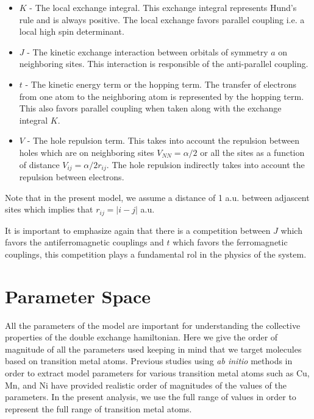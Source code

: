 \documentclass[12pt,twoside]{report}
\begin{document}
	\begin{itemize}
		
		\item $K$ - The local exchange integral. This exchange integral
		  represents Hund's rule and is always positive. The local exchange
		  favors parallel coupling i.e. a local high spin determinant.
		
		\item $J$ - The kinetic exchange interaction between orbitals of
		  symmetry $a$ on neighboring sites. This interaction is responsible of
		  the anti-parallel coupling.
		
		\item $t$ - The kinetic energy term or the hopping term. The transfer of
		  electrons from one atom to the neighboring atom is represented by the
		  hopping term. This also favors parallel coupling when taken along with
		  the exchange integral $K$.
		
		\item $V$ - The hole repulsion term. This takes into account the
		  repulsion between holes which are on neighboring sites $V_{NN}=\alpha
		  \slash 2$ or all the sites as a function of distance $V_{ij}=\alpha
		  \slash 2r_{ij}$. The hole repulsion indirectly takes into account the
		  repulsion between electrons.\cite{calzado_proposal_2001}
		
	\end{itemize}

	Note that in the present model, we assume a distance of 1 a.u. between adjascent
	sites which implies that $r_{ij} = |i-j|$ a.u.
	
	It is important to emphasize again that there is a competition between $J$ which favors the antiferromagnetic couplings and $t$ which favors the ferromagnetic couplings, this competition plays a fundamental rol in the physics of the system.
	
	\section{Parameter Space}
	
	All the parameters of the model are important for understanding the
	collective properties of the double exchange hamiltonian. Here we give the
	order of magnitude of all the parameters used keeping in mind that we target
	molecules based on transition metal atoms.  Previous studies using
	\textit{ab initio} methods in order to extract model parameters for various
	transition metal atoms such as Cu, Mn, and Ni have provided realistic order
	of magnitudes of the values of the parameters.  In the present analysis, we
	use the full range of values in order to represent the full range of
	transition metal atoms.
	
\end{document}
